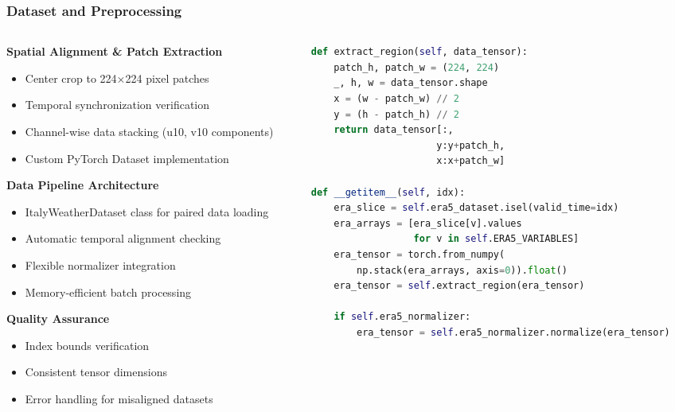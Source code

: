 \documentclass[footline=authortitle]{beamer}
\begin{document}
\begin{frame}[fragile]
\frametitle{Dataset and Preprocessing}
\scriptsize
\begin{columns}
    \begin{column}{0.55\textwidth}
        \textbf{Spatial Alignment \& Patch Extraction}
        \begin{itemize}
            \item Center crop to 224×224 pixel patches
            \item Temporal synchronization verification
            \item Channel-wise data stacking (u10, v10 components)
            \item Custom PyTorch Dataset implementation
        \end{itemize}

        \textbf{Data Pipeline Architecture}
        \begin{itemize}
            \item ItalyWeatherDataset class for paired data loading
            \item Automatic temporal alignment checking
            \item Flexible normalizer integration
            \item Memory-efficient batch processing
        \end{itemize}

        \textbf{Quality Assurance}
        \begin{itemize}
            \item Index bounds verification
            \item Consistent tensor dimensions
            \item Error handling for misaligned datasets
        \end{itemize}
    \end{column}

    \begin{column}{0.45\textwidth}
        \begin{lstlisting}[language=Python, basicstyle=\ttfamily\tiny]
def extract_region(self, data_tensor):
    patch_h, patch_w = (224, 224)
    _, h, w = data_tensor.shape
    x = (w - patch_w) // 2
    y = (h - patch_h) // 2
    return data_tensor[:, 
                      y:y+patch_h, 
                      x:x+patch_w]

def __getitem__(self, idx):
    era_slice = self.era5_dataset.isel(valid_time=idx)
    era_arrays = [era_slice[v].values 
                  for v in self.ERA5_VARIABLES]
    era_tensor = torch.from_numpy(
        np.stack(era_arrays, axis=0)).float()
    era_tensor = self.extract_region(era_tensor)

    if self.era5_normalizer:
        era_tensor = self.era5_normalizer.normalize(era_tensor)
        \end{lstlisting}
    \end{column}
\end{columns}
\end{frame}
\end{document}
